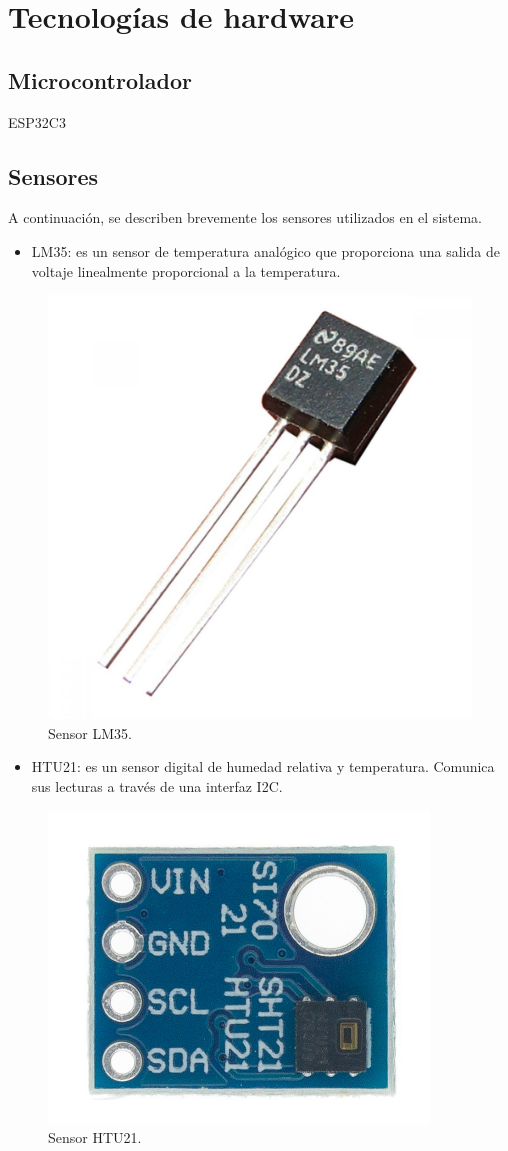 \section{Tecnologías de hardware}


\subsection{Microcontrolador}

ESP32C3

\subsection{Sensores}

A continuación, se describen brevemente los sensores utilizados en el sistema.

\begin{itemize}
    \item LM35: es un sensor de temperatura analógico que proporciona una salida de voltaje linealmente proporcional a la temperatura. \citep{sensor_lm35}
\end{itemize}

\begin{figure}[htpb]
    \centering
    \includegraphics[width=.2\textwidth]{./Figures/sensor_lm35.png}
    \caption{Sensor LM35.}
    \label{fig:lm35}
\end{figure}

\begin{itemize}
	\item HTU21: es un sensor digital de humedad relativa y temperatura. Comunica sus lecturas a través de una interfaz I2C. \citep{sensor_htu21}
\end{itemize}

\begin{figure}[htpb]
    \centering
    \includegraphics[width=.2\textwidth]{./Figures/sensor_htu21.png}
    \caption{Sensor HTU21.}
    \label{fig:htu21}
\end{figure}

